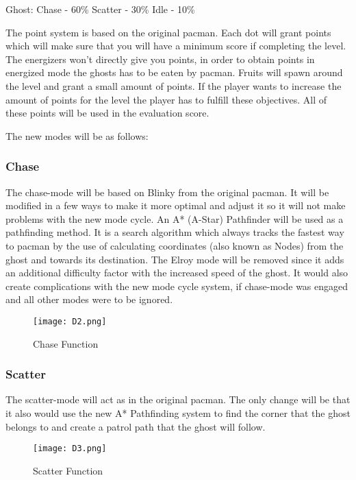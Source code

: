 \begin{center}
Ghost:
Chase - 60\%
Scatter - 30\%
Idle - 10\%
\end{center}


The point system is based on the original pacman. Each dot will grant points which will make sure that you will have a minimum score if completing the level. The energizers won’t directly give you points, in order to obtain points in energized mode the ghosts has to be eaten by pacman. Fruits will spawn around the level and grant a small amount of points. If the player wants to increase the amount of points for the level the player has to fulfill these objectives. All of these points will be used in the evaluation score.


The new modes will be as follows: 

\subsubsection{Chase}
The chase-mode will be based on Blinky from the original pacman. It will be modified in a few ways to make it more optimal and adjust it so it will not make problems with the new mode cycle. An A* (A-Star) Pathfinder will be used as a pathfinding method. It is a search algorithm which always tracks the fastest way to pacman by the use of calculating coordinates (also known as Nodes) from the ghost and towards its destination. The Elroy mode will be removed since it adds an additional difficulty factor with the increased speed of the ghost. It would also create complications with the new mode cycle system, if chase-mode was engaged and all other modes were to be ignored.


\begin{figure}[!htbp]
\centering
\texttt{[image: D2.png]}
\caption{ Chase Function }
\label{fig:Chase}
\end{figure}


\subsubsection{Scatter}
The scatter-mode will act as in the original pacman. The only change will be that it also would use the new A* Pathfinding system to find the corner that the ghost belongs to and create a patrol path that the ghost will follow.


\begin{figure}[!htbp]
\centering
\texttt{[image: D3.png]}
\caption{ Scatter Function }
\label{fig:Scatter}
\end{figure}


